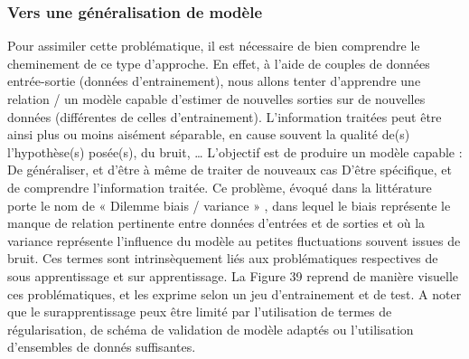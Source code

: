 \subsubsection{Vers une généralisation de modèle}
Pour assimiler cette problématique, il est nécessaire de bien comprendre le cheminement de ce type d’approche. En effet, à l’aide de couples de données entrée-sortie (données d’entrainement), nous allons tenter d’apprendre une relation / un modèle capable d’estimer de nouvelles sorties sur de nouvelles données (différentes de celles d’entrainement). 
L’information traitées peut être ainsi plus ou moins aisément séparable, en cause souvent la qualité de(s) l’hypothèse(s) posée(s), du bruit, … L’objectif est de produire un modèle capable :
	De généraliser, et d’être à même de traiter de nouveaux cas 
	D’être spécifique, et de comprendre l’information traitée.
Ce problème, évoqué dans la littérature porte le nom de « Dilemme biais / variance » , dans lequel le biais représente le manque de relation pertinente entre données d’entrées et de sorties et où la variance représente l’influence du modèle au petites fluctuations souvent issues de bruit. Ces termes sont intrinsèquement liés aux problématiques respectives de sous apprentissage et sur apprentissage. La Figure 39 reprend de manière visuelle ces problématiques, et les exprime selon un jeu d’entrainement et de test. A noter que le surapprentissage peux être limité par l’utilisation de termes de régularisation, de schéma de validation de modèle adaptés ou l’utilisation d’ensembles de donnés suffisantes. 
 
